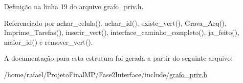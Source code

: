Definição na linha 19 do arquivo grafo\+\_\+priv.\+h.



Referenciado por achar\+\_\+celula(), achar\+\_\+id(), existe\+\_\+vert(), Grava\+\_\+\+Arq(), Imprime\+\_\+\+Tarefas(), inserir\+\_\+vert(), interface\+\_\+caminho\+\_\+completo(), ja\+\_\+feito(), maior\+\_\+id() e remover\+\_\+vert().



A documentação para esta estrutura foi gerada a partir do seguinte arquivo\+:\begin{DoxyCompactItemize}
\item 
/home/rafael/\+Projeto\+Final\+M\+P/\+Fase2\+Interface/include/\hyperlink{grafo__priv_8h}{grafo\+\_\+priv.\+h}\end{DoxyCompactItemize}
